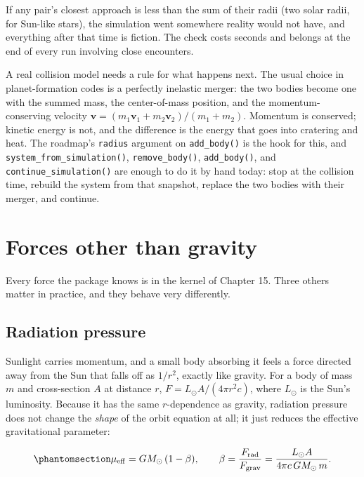 \documentclass[
  10.5pt,
  letterpaper,
]{scrbook}
\theoremstyle{definition}
\theoremstyle{plain}
\theoremstyle{remark}
\begin{document}
If any pair's closest approach is less than the sum of their radii (two
solar radii, for Sun-like stars), the simulation went somewhere reality
would not have, and everything after that time is fiction. The check
costs seconds and belongs at the end of every run involving close
encounters.

A real collision model needs a rule for what happens next. The usual
choice in planet-formation codes is a perfectly inelastic merger: the
two bodies become one with the summed mass, the center-of-mass position,
and the momentum-conserving velocity
\(\mathbf{v} = (m_1\mathbf{v}_1 + m_2\mathbf{v}_2)/(m_1+m_2)\). Momentum
is conserved; kinetic energy is not, and the difference is the energy
that goes into cratering and heat. The roadmap's \texttt{radius}
argument on \texttt{add\_body()} is the hook for this, and
\texttt{system\_from\_simulation()}, \texttt{remove\_body()},
\texttt{add\_body()}, and \texttt{continue\_simulation()} are enough to
do it by hand today: stop at the collision time, rebuild the system from
that snapshot, replace the two bodies with their merger, and continue.

\section{Forces other than gravity}\label{forces-other-than-gravity}

Every force the package knows is in the kernel of Chapter 15. Three
others matter in practice, and they behave very differently.

\subsection{Radiation pressure}\label{radiation-pressure}

Sunlight carries momentum, and a small body absorbing it feels a force
directed away from the Sun that falls off as \(1/r^2\), exactly like
gravity. For a body of mass \(m\) and cross-section \(A\) at distance
\(r\), \(F = L_\odot A/(4\pi r^2 c)\), where \(L_\odot\) is the Sun's
luminosity. Because it has the same \(r\)-dependence as gravity,
radiation pressure does not change the \emph{shape} of the orbit
equation at all; it just reduces the effective gravitational parameter:

\begin{equation}\protect\phantomsection\label{eq-beta}{
\mu_{\mathrm{eff}} = GM_\odot\,(1 - \beta), \qquad \beta = \frac{F_{\mathrm{rad}}}{F_{\mathrm{grav}}} = \frac{L_\odot A}{4\pi c\,GM_\odot\,m}.
}\end{equation}
\end{document}
